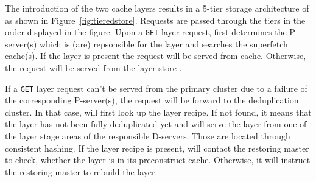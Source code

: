
The introduction of the two cache layers results in a 5-tier storage architecture of
\sysname as shown in Figure~\ref{fig:tieredstore}. Requests are passed through the
tiers in the order displayed in the figure. Upon a \texttt{GET} layer request,
\sysname first determines the P-server(s) which is (are) repsonsible for the layer
and searches the superfetch cache(s).
If the layer is present the request will be served from cache.
Otherwise, the request will be served from the layer store .

If a \texttt{GET} layer request can't be served from the primary cluster
due to a failure of the corresponding P-server(s),
the request will be forward to the deduplication cluster.
In that case, \sysname will first look up the layer recipe. If not found, it means that
the layer has not been fully deduplicated yet and \sysname will serve the layer
from one of the layer stage areas of the responsible D-servers. Those are located
through consistent hashing.
If the layer recipe is present, \sysname will contact the restoring master to
check, whether the layer is in its preconstruct cache. Otherwise, it will
instruct the restoring master to rebuild the layer.

